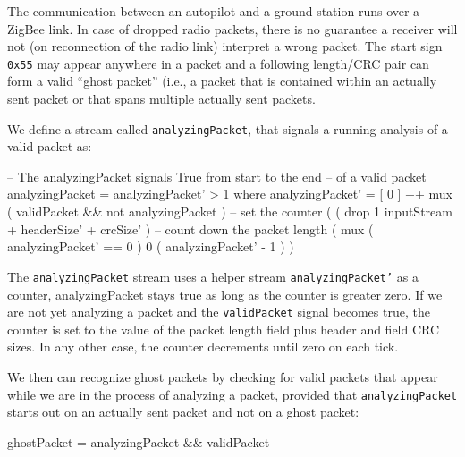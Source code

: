 The communication between an autopilot and a ground-station runs over
a ZigBee link. In case of dropped radio packets, there is no guarantee
a receiver will not (on reconnection of the radio link) interpret a
wrong packet. The start sign {\tt 0x55} may appear anywhere in a
packet and a following length/CRC pair can form a valid ``ghost
packet'' (i.e., a packet that is contained within an actually sent
packet or that spans multiple actually sent packets.

We define a stream called {\tt analyzingPacket}, that signals a running
analysis of a valid packet as:

\begin{code}
-- The analyzingPacket signals True from start to the end
-- of a valid packet
analyzingPacket = analyzingPacket' > 1
  where analyzingPacket' = [ 0 ] ++ mux
               ( validPacket && not analyzingPacket )
                -- set the counter
               ( ( drop 1 inputStream
                   + headerSize'
                   + crcSize' )
                 -- count down the packet length
                 ( mux ( analyzingPacket' == 0 )
                     0
                     ( analyzingPacket' - 1 ) )
\end{code}

The {\tt analyzingPacket} stream uses a helper stream {\tt analyzingPacket'}
as a counter, {analyzingPacket} stays true as long as the counter is greater
zero. If we are not yet analyzing a packet and the {\tt validPacket}
signal becomes true, the counter is set to the value of the packet length
field plus header and field CRC sizes. In any other case, the counter
decrements until zero on each tick.

We then can recognize ghost packets by checking for valid packets that
appear while we are in the process of analyzing a packet, provided
that {\tt analyzingPacket} starts out on an actually sent packet and
not on a ghost packet:

\begin{code}
ghostPacket = analyzingPacket && validPacket
\end{code}


